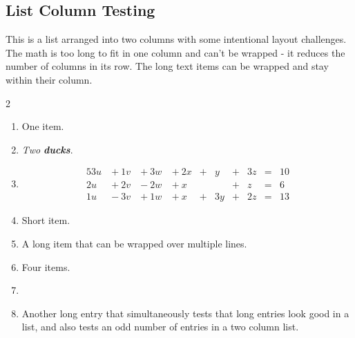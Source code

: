 \documentclass[pdflatex]{sn-jnl}
\theoremstyle{thmstyleone}%
\theoremstyle{thmstyletwo}%
\theoremstyle{thmstylethree}%
\newcommand{\alert}[1]{\textbf{\textit{#1}}}
\numberwithin{equation}{section}
\newcommand{\amp}{&}
\begin{document}
\subsection{List Column Testing}\label{section-lists-10}%
This is a list arranged into two columns with some intentional layout challenges. The math is too long to fit in one column and can't be wrapped - it reduces the number of columns in its row. The long text items can be wrapped and stay within their column.%
\begin{multicols}{2}
\begin{enumerate}[label={(\alph*)}]
\item{}One item.%
\item{}\emph{Two} \alert{ducks}.%
\item{}%
\begin{alignat*}{5}
3u \amp {}+{} 1v \amp {}+{} 3w \amp {}+{} 2x \amp {}+{} \amp  y \amp {}+{} \amp 3z \amp {}={} \amp 10\\
2u \amp {}+{} 2v \amp {}-{} 2w \amp {}+{} x  \amp       \amp    \amp {}+{} \amp  z \amp {}={} \amp 6\\
1u \amp {}-{} 3v \amp {}+{} 1w \amp {}+{} x  \amp {}+{} \amp 3y \amp {}+{} \amp 2z \amp {}={} \amp 13
\end{alignat*}
%
\item{}Short item.%
\item{}A long item that can be wrapped over multiple lines.%
\item{}Four items.%
\item{}%
\item{}Another long entry that simultaneously tests that long entries look good in a list, and also tests an odd number of entries in a two column list.%
\end{enumerate}
\end{multicols}
%
%
%
\typeout{************************************************}
\typeout{************************************************}
%
\end{document}
